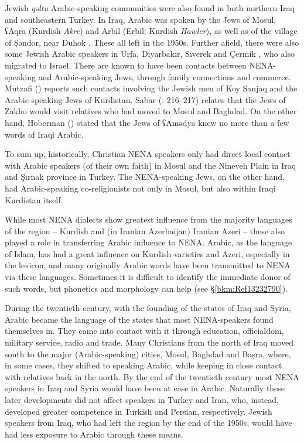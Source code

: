 \documentclass[output=paper]{langsci/langscibook}
\begin{document}
Jewish \textit{qəltu} Arabic-speaking communities were also found in both northern Iraq and southeastern Turkey. In Iraq, Arabic was spoken by the Jews of Mosul, ʕAqra (Kurdish \textit{Akre}) and Arbil (Erbil; Kurdish \textit{Hawler}), as well as of the village of Ṣəndor, near Duhok \citep[9]{Hoberman1989}. These all left in the 1950s. Further afield, there were also some Jewish Arabic speakers in Urfa, Diyarbakır, Siverek and Çermik \citep[4]{Jastrow1978}, who also migrated to Israel. There are known to have been contacts between NENA-speaking and Arabic-speaking Jews, through family connections and commerce. Mutzafi (\citeyear[6]{Mutzafi2004}) reports such contacts involving the Jewish men of Koy Sanjaq and the Arabic-speaking Jews of Kurdistan. Sabar (\citeyear{Sabar1978}: 216–217) relates that the Jews of Zakho would visit relatives who had moved to Mosul and Baghdad. On the other hand, Hoberman (\citeyear[9]{Hoberman1989}) stated that the Jews of ʕAmədya knew no more than a few words of Iraqi Arabic.

To sum up, historically, Christian NENA speakers only had direct local contact with Arabic speakers (of their own faith) in Mosul and the Nineveh Plain in Iraq and Şırnak province in Turkey. The NENA-speaking Jews, on the other hand, had Arabic-speaking co-religionists not only in Mosul, but also within Iraqi Kurdistan itself.

While most NENA dialects show greatest influence from the majority languages of the region – Kurdish and (in Iranian Azerbaijan) Iranian Azeri – these also played a role in transferring Arabic influence to NENA. Arabic, as the language of Islam, has had a great influence on Kurdish varieties and Azeri, especially in the lexicon, and many originally Arabic words have been transmitted to NENA via these languages. Sometimes it is difficult to identify the immediate donor of such words, but phonetics and morphology can help (see §\ref{bkm:Ref13232790}).

During the twentieth century, with the founding of the states of Iraq and Syria, Arabic became the language of the states that most NENA-speakers found themselves in. They came into contact with it through education, officialdom, military service, radio and trade. Many Christians from the north of Iraq moved south to the major (Arabic-speaking) cities, Mosul, Baghdad and Baṣra, where, in some cases, they shifted to speaking Arabic, while keeping in close contact with relatives back in the north. By the end of the twentieth century most NENA speakers in Iraq and Syria would have been at ease in Arabic. Naturally these later developments did not affect speakers in Turkey and Iran, who, instead, developed greater competence in Turkish and Persian, respectively. Jewish speakers from Iraq, who had left the region by the end of the 1950s, would have had less exposure to Arabic through these means.
\end{document}
